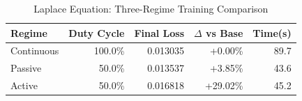 \begin{table}[htbp]
\centering
\caption{Laplace Equation: Three-Regime Training Comparison}
\label{tab:laplace_regimes}
\begin{tabular}{lrrrr}
\hline
Regime & Duty Cycle & Final Loss & $\Delta$ vs Base & Time(s) \\
\hline
Continuous & 100.0\% & 0.013035 & +0.00\% & 89.7 \\
Passive & 50.0\% & 0.013537 & +3.85\% & 43.6 \\
Active & 50.0\% & 0.016818 & +29.02\% & 45.2 \\
\hline
\end{tabular}
\end{table}
